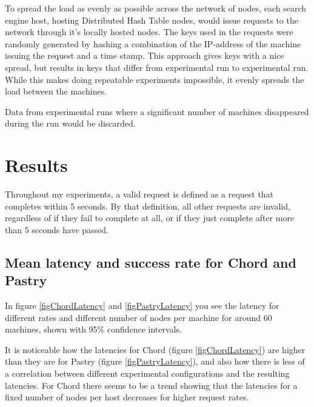 To spread the load as evenly as possible across the network of nodes, each search engine host, hosting Distributed Hash Table nodes, would issue requests to the network through it's locally hosted nodes.
The keys used in the requests were randomly generated by hashing a combination of the IP-address of the machine issuing the request and a time stamp. This approach gives keys with a nice spread, but results in keys that differ from experimental run to experimental run. While this makes doing repeatable experiments impossible, it evenly spreads the load between the machines.

Data from experimental runs where a significant number of machines disappeared during the run would be discarded.


\section{Results}
Throughout my experiments, a valid request is defined as a request that completes within 5 seconds. By that definition, all other requests are invalid, regardless of if they fail to complete at all, or if they just complete after more than 5 seconds have passed.

\subsection{Mean latency and success rate for Chord and Pastry}
In figure \ref{figChordLatency} and \ref{figPastryLatency} you see the latency for different rates and different number of nodes per machine for around 60 machines, shown with 95\% confidence intervals. 

It is noticeable how the latencies for Chord (figure \ref{figChordLatency}) are higher than they are for Pastry (figure \ref{figPastryLatency}), and also how there is less of a correlation between different experimental configurations and the resulting latencies.
For Chord there seems to be a trend showing that the latencies for a fixed number of nodes per host decreases for higher request rates.

